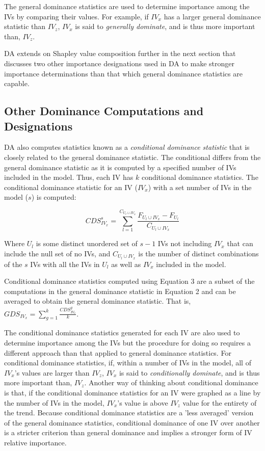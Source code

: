 \documentclass[ShortAfour,times,sageapa]{sagej}
\begin{document}
	The general dominance statistics are used to determine importance among the IVs by comparing their values.
	For example, if $IV_x$ has a larger general dominance statistic than $IV_z$, $IV_x$ is said to \emph{generally dominate}, and is thus more important than, $IV_z$.
	
	DA extends on Shapley value composition further in the next section that discusses two other importance designations used in DA to make stronger importance determinations than that which general dominance statistics are capable.
	
	\subsection{Other Dominance Computations and Designations}
	
	DA also computes statistics known as a \emph{conditional dominance statistic} that is closely related to the general dominance statistic.  
	The conditional differs from the general dominance statistic as it is computed by a specified number of IVs included in the model.
	Thus, each IV has $k$ conditional dominance statistics.
	The conditional dominance statistic for an IV ($IV_x$) with a set number of IVs in the model ($s$) is computed:
	
	\begin{equation}
		CDS_{IV_x}^{s} = \sum_{l=1}^{C_{U_l \cup IV_x}} \frac{ F_{U_l \cup IV_x} - F_{U_l}}{C_{U_l \cup IV_x}}
	\end{equation}

	Where $U_l$ is some distinct unordered set of $s-1$ IVs not including $IV_x$ that can include the null set of no IVs, and $C_{U_l \cup IV_x}$ is the number of distinct combinations of the $s$ IVs with all the IVs in $U_l$ as well as $IV_x$ included in the model.
	
	Conditional dominance statistics computed using Equation 3 are a subset of the computations in the general dominance statistic in Equation 2 and can be averaged to obtain the general dominance statistic.  
	That is, $GDS_{IV_x} = \sum_{g=1}^{k} \frac{CDS_{IV_x}^{g}}{k}$.
	
	The conditional dominance statistics generated for each IV are also used to determine importance among the IVs but the procedure for doing so requires a different approach than that applied to general dominance statistics.
	For conditional dominance statistics, if, within a number of IVs in the model, all of $IV_x$'s values are larger than $IV_z$, $IV_x$ is said to \emph{conditionally dominate}, and is thus more important than, $IV_z$.
	Another way of thinking about conditional dominance is that, if the conditional dominance statistics for an IV were graphed as a line by the number of IVs in the model, $IV_x$'s value is above $IV_z$ value for the entirety of the trend.	
	Because conditional dominance statistics are a 'less averaged' version of the general dominance statistics, conditional dominance of one IV over another is a stricter criterion than general dominance and implies a stronger form of IV relative importance.
	
\end{document}
